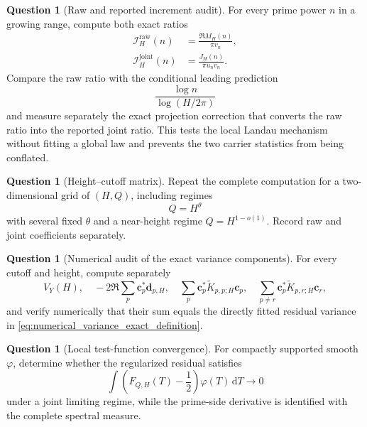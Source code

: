 \documentclass[11pt]{amsart}
\numberwithin{equation}{section}
\theoremstyle{plain}
\theoremstyle{definition}
\newtheorem{question}[theorem]{Question}
\theoremstyle{remark}
\newcommand{\1}{\mathbf{1}}
\newcommand{\dd}{\,\mathrm{d}}
\begin{document}
\begin{question}[Raw and reported increment audit]
\label{question:increment_audit}
For every prime power \(n\) in a growing range, compute both exact ratios
\begin{align}
\mathcal I_H^{\mathrm{raw}}(n)
&=
\frac{\Re M_H(n)}{\pi v_n},
\label{eq:increment_audit_ratio}
\\
\mathcal I_H^{\mathrm{joint}}(n)
&=
\frac{J_H(n)}{\pi u_nv_n}.
\label{eq:joint_increment_audit_ratio}
\end{align}
Compare the raw ratio with the conditional leading prediction
\begin{equation}
\frac{\log n}{\log(H/2\pi)}
\label{eq:increment_audit_prediction}
\end{equation}
and measure separately the exact projection correction that converts the
raw ratio into the reported joint ratio.  This tests the local Landau
mechanism without fitting a global law and prevents the two carrier
statistics from being conflated.
\end{question}

\begin{question}[Height--cutoff matrix]
\label{question:height_cutoff_matrix}
Repeat the complete computation for a two-dimensional grid of
\((H,Q)\), including regimes
\begin{equation}
Q=H^\theta
\label{eq:height_cutoff_regime}
\end{equation}
with several fixed \(\theta\) and a near-height regime
\(Q=H^{1-o(1)}\).  Record raw and joint coefficients separately.
\end{question}

\begin{question}[Numerical audit of the exact variance components]
\label{question:projected_tower_blocks}
For every cutoff and height, compute separately
\begin{equation}
V_Y(H),
\quad
-2\Re\sum_p\mathbf c_p^\ast\mathbf d_{p,H},
\quad
\sum_p\mathbf c_p^\ast\widetilde K_{p,p;H}\mathbf c_p,
\quad
\sum_{p\neq r}\mathbf c_p^\ast\widetilde K_{p,r;H}\mathbf c_r,
\label{eq:numerical_variance_components}
\end{equation}
and verify numerically that their sum equals the directly fitted residual
variance in \eqref{eq:numerical_variance_exact_definition}.
\end{question}

\begin{question}[Local test-function convergence]
\label{question:local_test_functions}
For compactly supported smooth \(\varphi\), determine whether the
regularized residual satisfies
\begin{equation}
\int
\left(F_{Q,H}(T)-\frac12\right)\varphi(T)\dd T
\longrightarrow0
\label{eq:test_function_target}
\end{equation}
under a joint limiting regime, while the prime-side derivative is
identified with the complete spectral measure.
\end{question}
\end{document}
